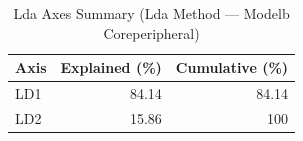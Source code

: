 \begin{table}[htbp]
  \centering
  \caption{Lda Axes Summary (Lda Method — Modelb Coreperipheral)}
  \label{tab:LDA_Method_ModelB_CorePeripheral_tables_lda_axes_summary}
  \begin{tabular}{lrr}
    \toprule
    Axis & Explained (\%) & Cumulative (\%) \\
    \midrule
    LD1 & 84.14 & 84.14 \\
    LD2 & 15.86 & 100 \\
    \bottomrule
  \end{tabular}
\end{table}
